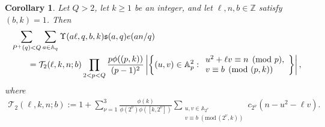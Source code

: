 \documentclass[12pt,reqno]{amsart}
\numberwithin{equation}{section}
\newtheorem{corollary}[equation]{Corollary}
\theoremstyle{definition}
\theoremstyle{remark}
\begin{document}
\begin{corollary}\label{c:generalmajorprimesquareprog}
Let $Q>2$, let $k\geq1$ be an integer, and let $\ell,n,b\in\mathbb Z$ satisfy $(b,k)=1$. Then
\begin{align}\label{e:generalcorupss}
 &\sum_{P^+(q)<Q}\sum_{a\in\mathbb A_q}
 \Upsilon(a\ell,q,b,k)\mathfrak s(a,q)e(an/q)\notag\\
 &\qquad=
 \mathcal T_2(\ell,k,n;b)
 \prod_{2<p<Q}
 \frac{p\phi((p,k))}{(p-1)^2}
 \left|\left\{(u,v)\in\mathbb A_p^2:
 \begin{array}{l}
  u^2+\ell v\equiv n\pmod p,\\
  v\equiv b\pmod{(p,k)}
 \end{array}\right\}\right|,
\end{align}
where 
\begin{align}\label{e:generalT2}
 \mathcal T_2(\ell,k,n;b)
 :=
 1+\sum_{\nu=1}^{3}
 \frac{\phi(k)}
 {\phi(2^\nu)\phi([k,2^\nu])}
 \sum_{\substack{u,v\in\mathbb A_{2^\nu}\\
 v\equiv b\;(\mathrm{mod}\,(2^\nu,k))}}
 c_{2^\nu}(n-u^2-\ell v).
\end{align}
\end{corollary}

\end{document}
